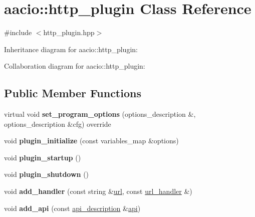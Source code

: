 \hypertarget{classaacio_1_1http__plugin}{}\section{aacio\+:\+:http\+\_\+plugin Class Reference}
\label{classaacio_1_1http__plugin}


{\ttfamily \#include $<$http\+\_\+plugin.\+hpp$>$}



Inheritance diagram for aacio\+:\+:http\+\_\+plugin\+:


Collaboration diagram for aacio\+:\+:http\+\_\+plugin\+:
\subsection*{Public Member Functions}
\begin{DoxyCompactItemize}
\item 
\mbox{\label{classaacio_1_1http__plugin_a2e39d7f76df8d0439d9b96b2f831792d}} 
virtual void {\bfseries set\+\_\+program\+\_\+options} (options\+\_\+description \&, options\+\_\+description \&cfg) override
\item 
\mbox{\label{classaacio_1_1http__plugin_afa288bc1fb5bb5f671a037aaff356b95}} 
void {\bfseries plugin\+\_\+initialize} (const variables\+\_\+map \&options)
\item 
\mbox{\label{classaacio_1_1http__plugin_a472282ceb1e8956885fe257992d5c2ee}} 
void {\bfseries plugin\+\_\+startup} ()
\item 
\mbox{\label{classaacio_1_1http__plugin_af04c67c9d1ab9fa18b1cf5de7383eb0b}} 
void {\bfseries plugin\+\_\+shutdown} ()
\item 
\mbox{\label{classaacio_1_1http__plugin_aeb62ef44e2f30e10c72722ced1aa0cfe}} 
void {\bfseries add\+\_\+handler} (const string \&\mbox{\hyperlink{classfc_1_1url}{url}}, const \mbox{\hyperlink{http__plugin_8hpp_af4e4e7e4ab464060f4b44e0cf75d1840}{url\+\_\+handler}} \&)
\item 
\mbox{\label{classaacio_1_1http__plugin_ad0647507b284a9b7ffea57a7623f2050}} 
void {\bfseries add\+\_\+api} (const \mbox{\hyperlink{http__plugin_8hpp_af3c2de945fc91d939e42846484b77f34}{api\+\_\+description}} \&\mbox{\hyperlink{classfc_1_1api}{api}})
\end{DoxyCompactItemize}
